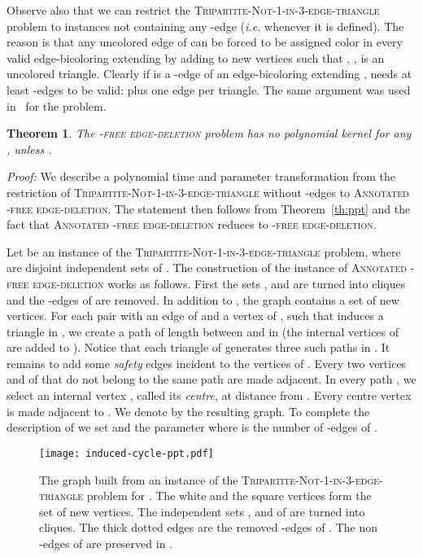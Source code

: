 \documentclass[11pt]{article}
\newenvironment{proof}{\noindent\textit{Proof: }}{{\hfill }}
\newtheorem{theorem}[lemma]{Theorem}
\newcommand{\tgbc}{\textsc{Tripartite-Not-1-in-3-edge-triangle}}
\begin{document}
Observe also that we can restrict the \tgbc{} problem to instances  not containing any -edge (\emph{i.e.}  whenever it is defined). The reason is that any uncolored edge  of  can be forced to be assigned color  in every valid edge-bicoloring extending  by adding to   new vertices  such that , , is an uncolored triangle. Clearly if  is a -edge of an edge-bicoloring  extending ,  needs at least  -edges to be valid:  plus one edge per triangle. The same argument was used in~\cite{KW09} for the \notone{} problem.

\newpage

\begin{theorem} \label{prop3} 
The \textsc{-free edge-deletion} problem has no polynomial kernel for any , unless .
\end{theorem}

\begin{proof}
We describe a polynomial time and parameter transformation from the restriction of \tgbc{} without -edges to \textsc{Annotated -free edge-deletion}. The statement then follows from Theorem~\ref{th:ppt} and the fact that \textsc{Annotated -free edge-deletion} reduces to \textsc{-free edge-deletion}.

Let  be an instance of the \tgbc{} problem, where  are disjoint independent sets of . The construction of the instance  of \textsc{Annotated -free edge-deletion} works as follows. First the sets ,  and  are turned into cliques and the -edges of  are removed. In addition to , the graph  contains a set  of new vertices. For each pair  with  an edge of  and  a vertex of , such that  induces a triangle in , we create a path  of length  between  and  in  (the internal vertices of  are added to ). Notice that each triangle of  generates three such paths in . It remains to add some \emph{safety} edges incident to the vertices of . Every two vertices  and  of  that do not belong to the same path are made adjacent.
In every path , we select an internal vertex , called its \emph{centre}, at distance  from . Every centre vertex  is made adjacent to . We denote by  the resulting graph. To complete the description of  we set  and the parameter  where  is the number of -edges of .

\begin{figure}[ht]
\centerline{\texttt{[image: induced-cycle-ppt.pdf]}}
\caption{The graph  built from an instance  of the \tgbc{} problem for . The white and the square vertices form the set  of new vertices. The independent sets ,  and  of  are turned into cliques. The thick dotted edges are the removed -edges of . The non -edges of  are preserved in . 
\label{fig:cycle}}
\end{figure}


\end{proof}
\end{document}
